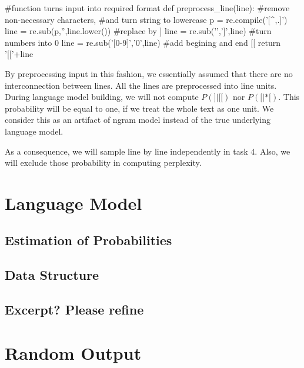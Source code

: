 \documentclass{article}
\begin{document}
\begin{python}

#function turns input into required format
def preprocess_line(line):
    #remove non-necessary characters, 
    #and turn string to lowercase
    p = re.compile('[^\w\s,.]')
    line = re.sub(p,'',line.lower())
    #replace \n by ]
    line = re.sub('\n',']',line)
    #turn numbers into 0
    line = re.sub('[0-9]','0',line)
    #add begining and end [[
    return '[['+line
\end{python}
By preprocessing input in this fashion, we essentially assumed that there are no interconnection between lines. All the lines are preprocessed into line units. During language model building, we will not compute $P(]|[[)$ nor  $P([|*[)$. This probability will be equal to one, if we treat the whole text as one unit. We consider this as an artifact of ngram model instead of the true underlying language model.

As a consequence, we will sample line by line independently in task 4. Also, we will exclude those probability in computing perplexity.

\section{Language Model}

\subsection{Estimation of Probabilities}

\subsection{Data Structure}

\subsection{Excerpt? Please refine}

\section{Random Output}
\end{document}
